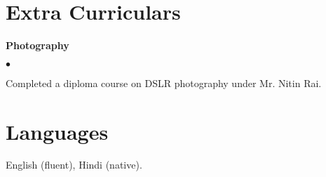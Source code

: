 \documentclass[margin,line]{res}
\newenvironment{list2}{
  \begin{list}{$\bullet$}{%
      \setlength{\itemsep}{0in}
      \setlength{\parsep}{0in} \setlength{\parskip}{0in}
      \setlength{\topsep}{0in} \setlength{\partopsep}{0in} 
      \setlength{\leftmargin}{0.2in}}}{\end{list}}
\begin{document}
\begin{resume}
\section{\sc Extra Curriculars}

{\bf Photography}

\vspace*{.2cm}
\begin{list2}
\item Completed a diploma course on DSLR photography under Mr. Nitin Rai.
\end{list2}

\section{\sc Languages}

English (fluent), Hindi (native).



\end{resume}
\end{document}
